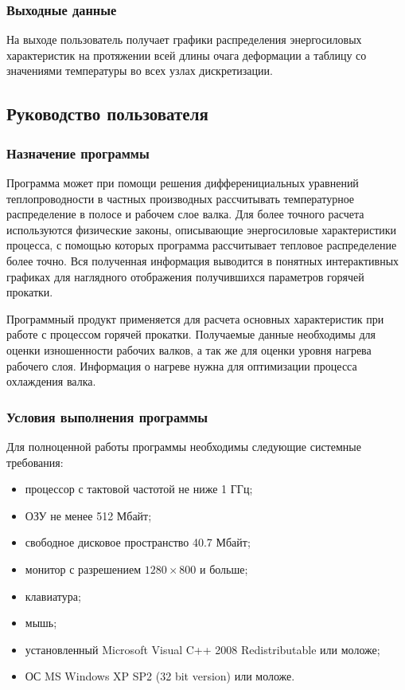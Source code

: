 \subsubsection{Выходные данные}
На выходе пользователь получает графики распределения энергосиловых характеристик на протяжении всей длины очага деформации а таблицу со значениями температуры во всех узлах дискретизации.

\subsection{Руководство пользователя}
\subsubsection{Назначение программы}
Программа может при помощи решения дифференициальных уравнений теплопроводности в частных производных рассчитывать температурное распределение в полосе и рабочем слое валка. Для более точного расчета используются физические законы, описывающие энергосиловые характеристики процесса, с помощью которых программа рассчитывает тепловое распределение более точно. Вся полученная информация выводится в понятных интерактивных графиках для наглядного отображения получившихся параметров горячей прокатки.

Программный продукт применяется для расчета основных характеристик при работе с процессом горячей прокатки. Получаемые данные необходимы для оценки изношенности рабочих валков, а так же для оценки уровня нагрева рабочего слоя. Информация о нагреве нужна для оптимизации процесса охлаждения валка.

\subsubsection{Условия выполнения программы}
Для полноценной работы программы необходимы следующие системные требования:

\begin{itemize}
\item процессор с тактовой частотой не ниже 1 ГГц;
\item ОЗУ не менее 512 Мбайт;
\item свободное дисковое пространство 40.7 Мбайт;
\item монитор с разрешением $1280\times 800$ и больше;
\item клавиатура;
\item мышь;
\item установленный Microsoft Visual C++ 2008 Redistributable или моложе;
\item ОС MS Windows XP SP2 (32 bit version) или моложе.
\end{itemize}

